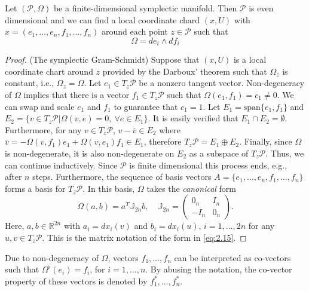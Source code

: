 \begin{corollary} \label{theorem:2.7}
Let $(\mathcal P, \Omega)$ be a finite-dimensional symplectic manifold. Then $\mathcal P$ is even dimensional and we can find a local coordinate chard $(x,U)$ with $x=(e_1,\dots,e_n,f_1,\dots,f_n)$ around each point $z\in \mathcal P$ such that
\begin{equation} \label{eq:2.15}
	\Omega = de_i\wedge df_i
\end{equation}
\end{corollary}
\begin{proof}
(The symplectic Gram-Schmidt) Suppose that $(x,U)$ is a local coordinate chart around $z$ provided by the Darboux' theorem such that $\Omega_z$ is constant, i.e., $\Omega_z = \Omega$. Let $e_1\in T_z\mathcal P$ be a nonzero tangent vector. Non-degeneracy of $\Omega$ implies that there is a vector $f_1\in T_z\mathcal P$ such that $\Omega(e_1,f_1) = c_1 \neq 0$. We can swap and scale $e_1$ and $f_1$ to guarantee that $c_1 = 1$. Let $E_1 = \text{span}\{e_1,f_1\}$ and $E_2 = \{v\in T_z\mathcal P | \Omega(v,e) = 0,~ \forall e \in E_1\}$. It is easily verified that $E_1\cap E_2 = \emptyset$. Furthermore, for any $v\in T_z\mathcal P$, $v - \bar v \in E_2$ where $\bar v = -\Omega(v,f_1)e_1 + \Omega(v,e_1)f_1 \in E_1$, therefore $T_z\mathcal P = E_1 \oplus E_2$. Finally, since $\Omega$ is non-degenerate, it is also non-degenerate on $E_2$ as a subspace of $T_z\mathcal P$. Thus, we can continue inductively. Since $\mathcal P$ is finite dimensional this process ends, e.g., after $n$ steps. Furthermore, the sequence of basis vectors $A = \{ e_1,\dots,e_n,f_1,\dots,f_n\}$ forms a basis for $T_z\mathcal P$. In this basis, $\Omega$ takes the \emph{canonical} form
\begin{equation} \label{eq:2.141}
	\Omega( a, b) = a^T\mathbb J_{2n}b, \quad \mathbb J_{2n} =
	\begin{pmatrix}
		0_n & I_n \\
		-I_n & 0_n
	\end{pmatrix}.
\end{equation}
Here, $a,b\in \mathbb R^{2n}$ with $a_i = dx_i(v)$ and $b_i = dx_i(u)$, $i=1,\dots,2n$ for any $u,v \in T_z\mathcal P$. This is the matrix notation of the form in \eqref{eq:2.15}.
\end{proof}

Due to non-degeneracy of $\Omega$, vectors $f_1,\dots,f_n$ can be interpreted as co-vectors such that $\Omega^{\flat}(e_i)=f_i$, for $i=1,\dots,n$. By abusing the notation, the co-vector property of these vectors is denoted by $f^*_1,\dots,f^*_n$.

